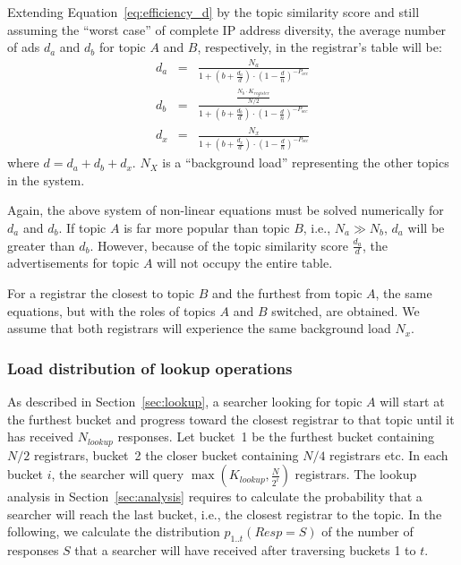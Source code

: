 Extending Equation~\ref{eq:efficiency_d} by the topic similarity score and still assuming the ``worst case'' of complete IP address diversity, the average number of ads $d_a$ and $d_b$ for topic $A$ and $B$, respectively, in the registrar's table will be:
\begin{eqnarray}
d_a & = & \frac{N_a}{1 + (b + \frac{d_a}{d}) \cdot (1 - \frac{d}{n})^{-P_\textit{occ}}}\label{eq:da_fair}\\
d_b & = & \frac{\frac{N_b\cdot K_\textit{register}}{N/2}}{1 + (b + \frac{d_b}{d}) \cdot (1 - \frac{d}{n})^{-P_\textit{occ}}}\\
\label{eq:da_fair2}
d_x & = & \frac{N_x}{1 + (b + \frac{d_x}{d}) \cdot (1 - \frac{d}{n})^{-P_\textit{occ}}}
\end{eqnarray}
where $d = d_a + d_b + d_x$. $N_X$ is a ``background load'' representing the other topics in the system.

Again, the above system of non-linear equations must be solved numerically for $d_a$ and $d_b$.
If topic $A$ is far more popular than topic $B$, i.e., $N_a \gg N_b$, $d_a$ will be greater than $d_b$. However, because of the topic similarity score $\frac{d_a}{d}$, the advertisements for topic $A$ will not occupy the entire table.

For a registrar the closest to topic $B$ and the furthest from topic $A$, the same equations, but with the roles of topics $A$ and $B$ switched, are obtained. We assume that both registrars will experience the same background load $N_x$.

\subsubsection{Load distribution of lookup operations}

As described in Section~\ref{sec:lookup}, a searcher looking for topic $A$ will start at the furthest bucket and progress toward the closest registrar to that topic until it has received $N_\textit{lookup}$ responses.
Let bucket~1 be the furthest bucket containing $N/2$ registrars, bucket~2 the closer bucket containing $N/4$ registrars etc. In each bucket $i$, the searcher will query $\max(K_\textit{lookup}, \frac{N}{2^i})$ registrars.
The lookup analysis in Section~\ref{sec:analysis} requires to calculate the probability that a searcher will reach the last bucket, i.e., the closest registrar to the topic. In the following, we calculate the distribution $p_{1..t}(Resp=S)$ of the number of responses $S$ that a searcher will have received after traversing buckets 1 to $t$.


